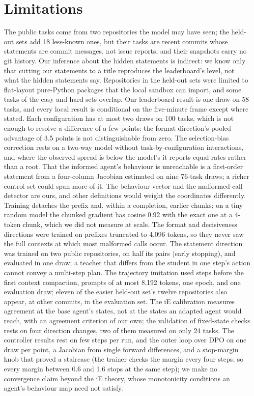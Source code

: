 \documentclass[11pt]{article}
\begin{document}
\section{Limitations}\label{sec:limitations}

The public tasks come from two repositories the model may have seen; the held-out sets add 18 less-known ones, but their tasks are recent commits whose statements are commit messages, not issue reports, and their snapshots carry no git history. Our inference about the hidden statements is indirect: we know only that cutting our statements to a title reproduces the leaderboard's level, not what the hidden statements say. Repositories in the held-out sets were limited to flat-layout pure-Python packages that the local sandbox can import, and some tasks of the easy and hard sets overlap. Our leaderboard result is one draw on 58 tasks, and every local result is conditional on the five-minute frame except where stated. Each configuration has at most two draws on 100 tasks, which is not enough to resolve a difference of a few points: the format direction's pooled advantage of 3.5 points is not distinguishable from zero. The selection-bias correction rests on a two-way model without task-by-configuration interactions, and where the observed spread is below the model's it reports equal rates rather than a root. That the informed agent's behaviour is unreachable is a first-order statement from a four-column Jacobian estimated on nine 76-task draws; a richer control set could span more of it. The behaviour vector and the malformed-call detector are ours, and other definitions would weight the coordinates differently. Training detaches the prefix and, within a completion, earlier chunks; on a tiny random model the chunked gradient has cosine 0.92 with the exact one at a 4-token chunk, which we did not measure at scale. The format and decisiveness directions were trained on prefixes truncated to 4,096 tokens, so they never saw the full contexts at which most malformed calls occur. The statement direction was trained on two public repositories, on half its pairs (early stopping), and evaluated in one draw; a teacher that differs from the student in one step's action cannot convey a multi-step plan. The trajectory imitation used steps before the first context compaction, prompts of at most 8,192 tokens, one epoch, and one evaluation draw; eleven of the easier held-out set's twelve repositories also appear, at other commits, in the evaluation set. The iE calibration measures agreement at the base agent's states, not at the states an adapted agent would reach, with an agreement criterion of our own; the validation of fixed-state checks rests on four direction changes, two of them measured on only 24 tasks. The controller results rest on few steps per run, and the outer loop over DPO on one draw per point, a Jacobian from single forward differences, and a stop-margin knob that proved a staircase (the trainer checks the margin every four steps, so every margin between 0.6 and 1.6 stops at the same step); we make no convergence claim beyond the iE theory, whose monotonicity conditions an agent's behaviour map need not satisfy.
\end{document}
